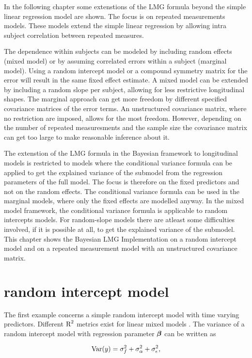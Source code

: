 \documentclass[11pt,a4paper,twoside]{book}\usepackage[]{graphicx}\usepackage[]{color}
\begin{document}
In the following chapter some extenstions of the LMG formula beyond the simple linear regression model are shown. The focus is on repeated measurements models. These models extend the simple linear regression by allowing intra subject correlation between repeated measures.

The dependence within subjects can be modeled by including random effects (mixed model) or by assuming correlated errors within a subject (marginal model). Using a random intercept model or a compound symmetry matrix for the error will result in the same fixed effect estimate. A mixed model can be extended by including a random slope per subject, allowing for less restrictive longitudinal shapes. The marginal approach can get more freedom by different specified covariance matrices of the error terms. An unstructured covariance matrix, where no restriction are imposed, allows for the most freedom. However, depending on the number of repeated measuresments and the sample size the covariance matrix can get too large to make reasonable inference about it. 

The extenstion of the LMG formula in the Bayesian framework to longitudinal models is restricted to models where the conditional variance formula can  be applied to get the explained variance of the submodel from the regression parameters of the full model. The focus is therefore on the fixed predictors and not on the random effects. The conditional variance formula can be used in the marginal models, where only the fixed effects are modelled anyway. In the mixed model framework, the conditional variance formula is applicable to random intercepts models. For random-slope models there are atleast some difficulties involved, if it is possible at all, to get the explained variance of the submodel. This chapter shows the Bayesian LMG Implementation on a random intercept model and on a repeated measurement model with an unstructured covariance matrix.  


\section{random intercept model}
The first example concerns a simple random intercept model with time varying predictors.  Different $\text{R}^2$ metrics exist for linear mixed models \citep{Nakagawa2013}. The variance of a random intercept model with regression parameter ${\boldsymbol{\beta}}$ can be written as

      \begin{align} 
        \operatorname{Var}(y) = \sigma_{f}^2  + \sigma_{\alpha}^2 + \sigma_{\epsilon}^2, \label{eq:var.t.ri} 
        \end{align}
\end{document}

